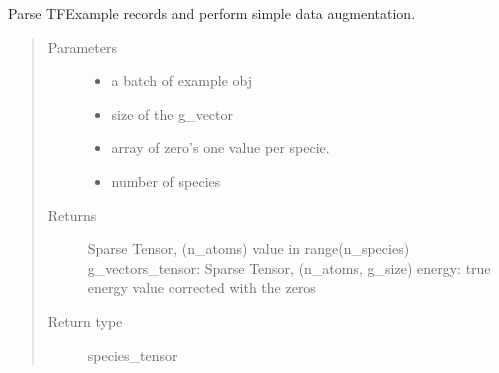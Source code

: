 \documentclass[letterpaper,10pt,english]{sphinxmanual}
\begin{document}
\begin{fulllineitems}
\label{\detokenize{neuralnet/inputs:inputs.parse_fn_v1}}
Parse TFExample records and perform simple data augmentation.
\begin{quote}\begin{description}
\item[{Parameters}] \leavevmode\begin{itemize}
\item {} 
 \textendash{} a batch of example obj

\item {} 
 \textendash{} size of the g\_vector

\item {} 
 \textendash{} array of zero’s one value per specie.

\item {} 
 \textendash{} number of species

\end{itemize}

\item[{Returns}] \leavevmode
Sparse Tensor, (n\_atoms) value in range(n\_species)
g\_vectors\_tensor: Sparse Tensor, (n\_atoms, g\_size)
energy: true energy value corrected with the zeros

\item[{Return type}] \leavevmode
species\_tensor

\end{description}\end{quote}

\end{fulllineitems}

\end{document}
